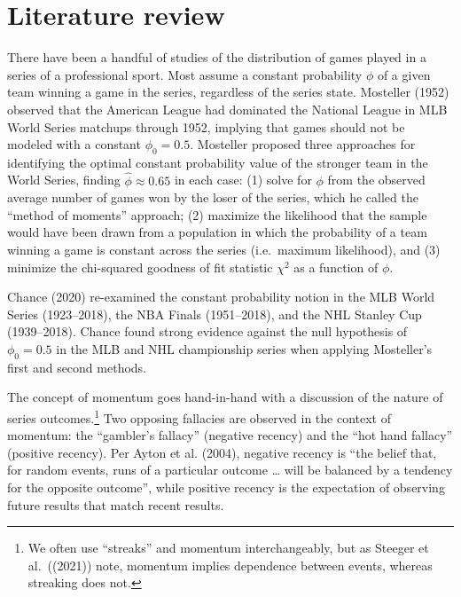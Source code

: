 \documentclass{article}
\begin{document}
\hypertarget{literature-review}{%
\section{Literature review}\label{literature-review}}

There have been a handful of studies of the distribution of games played
in a series of a professional sport. Most assume a constant probability
\(\phi\) of a given team winning a game in the series, regardless of the
series state. Mosteller (1952) observed that the American League had
dominated the National League in MLB World Series matchups through 1952,
implying that games should not be modeled with a constant
\(\phi_0 = 0.5\). Mosteller proposed three approaches for identifying
the optimal constant probability value of the stronger team in the World
Series, finding \(\hat{\phi} \approx 0.65\) in each case: (1) solve for
\(\phi\) from the observed average number of games won by the loser of
the series, which he called the ``method of moments'' approach; (2)
maximize the likelihood that the sample would have been drawn from a
population in which the probability of a team winning a game is constant
across the series (i.e.~maximum likelihood), and (3) minimize the
chi-squared goodness of fit statistic \(\chi^2\) as a function of
\(\phi\).

Chance (2020) re-examined the constant probability notion in the MLB
World Series (1923--2018), the NBA Finals (1951--2018), and the NHL
Stanley Cup (1939--2018). Chance found strong evidence against the null
hypothesis of \(\phi_0 = 0.5\) in the MLB and NHL championship series
when applying Mosteller's first and second methods.

The concept of momentum goes hand-in-hand with a discussion of the
nature of series outcomes.\footnote{We often use ``streaks'' and
  momentum interchangeably, but as Steeger et al.~((2021)) note,
  momentum implies dependence between events, whereas streaking does
  not.} Two opposing fallacies are observed in the context of momentum:
the ``gambler's fallacy'' (negative recency) and the ``hot hand
fallacy'' (positive recency). Per Ayton et al. (2004), negative recency
is ``the belief that, for random events, runs of a particular outcome
\ldots{} will be balanced by a tendency for the opposite outcome'',
while positive recency is the expectation of observing future results
that match recent results.
\end{document}
